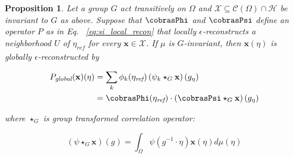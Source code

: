 \documentclass[twocolumn,10pt]{article}
\newtheorem{proposition}[theorem]{Proposition}
\begin{document}
\begin{proposition} \label{si_prop:lie_conv}
Let a group $G$ act transitively on $\Omega$ and $\mathcal X \subseteq \mathcal{C}(\Omega) \cap \mathcal H$ be invariant to $G$ as above. Suppose that  $\cobrasPhi$ and $\cobrasPsi$ define an operator $P$ as in Eq. ~\ref{eq:si_local_recon} that locally $\epsilon$-reconstructs a neighborhood $U$ of $\eta_{\textit{ref}}$ for every $\mathbf x \in \mathcal X$. If $\mu$ is $G$-invariant, then $\mathbf{x}(\eta)$ is globally $\epsilon$-reconstructed by

\begin{align}
    P_{\textit{global}}(\mathbf{x})(\eta) 
        &= \sum_k \phi_k(\eta_{\textit{ref}})\left(\psi_k \star_G \mathbf x\right)(g_\eta) \\
        &= 
        \cobrasPhi(\eta_{\textit{ref}}) 
        \cdot 
        \left(\cobrasPsi \star_G \mathbf{x} \right)(g_\eta)
\end{align}

\noindent where $\star_G$ is group transformed correlation operator:

$$\left(\psi \star_G \mathbf x\right)(g)
= \int_\Omega \psi(g^{-1} \cdot \eta) \mathbf{x}(\eta)d\mu(\eta)
$$


\end{proposition}
\end{document}
